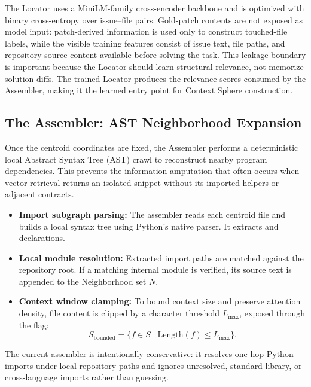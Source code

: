 The Locator uses a MiniLM-family cross-encoder backbone and is optimized with binary cross-entropy over issue--file pairs. Gold-patch contents are not exposed as model input: patch-derived information is used only to construct touched-file labels, while the visible training features consist of issue text, file paths, and repository source content available before solving the task. This leakage boundary is important because the Locator should learn structural relevance, not memorize solution diffs. The trained Locator produces the relevance scores consumed by the Assembler, making it the learned entry point for Context Sphere construction.

\subsection{The Assembler: AST Neighborhood Expansion}

Once the centroid coordinates are fixed, the Assembler performs a deterministic local Abstract Syntax Tree (AST) crawl to reconstruct nearby program dependencies. This prevents the information amputation that often occurs when vector retrieval returns an isolated snippet without its imported helpers or adjacent contracts.

\begin{itemize}
    \item \textbf{Import subgraph parsing:} The assembler reads each centroid file and builds a local syntax tree using Python's native  parser. It extracts  and  declarations.
    \item \textbf{Local module resolution:} Extracted import paths are matched against the repository root. If a matching internal module is verified, its source text is appended to the Neighborhood set \(N\).
    \item \textbf{Context window clamping:} To bound context size and preserve attention density, file content is clipped by a character threshold \(L_{\max}\), exposed through the  flag:
    \begin{equation}
        S_{\text{bounded}} = \{f \in S \mid \mathrm{Length}(f) \le L_{\max}\}.
    \end{equation}
\end{itemize}

The current assembler is intentionally conservative: it resolves one-hop Python imports under local repository paths and ignores unresolved, standard-library, or cross-language imports rather than guessing.

